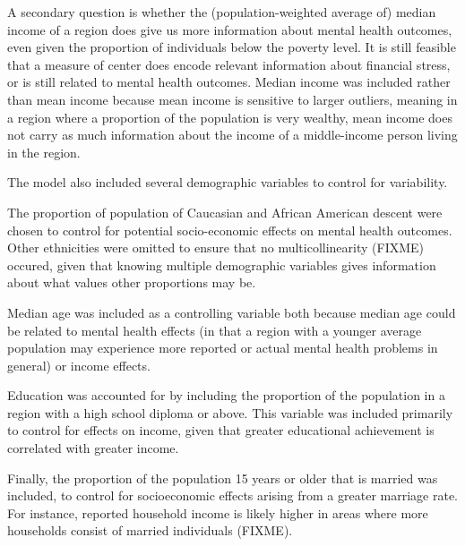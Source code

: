 \documentclass{article}
\begin{document}
A secondary question is whether the (population-weighted average of)
median income of a region does give us more information about mental
health outcomes, even given the proportion of individuals below the
poverty level. It is still feasible that a measure of center does encode
relevant information about financial stress, or is still related to
mental health outcomes. Median income was included rather than mean
income because mean income is sensitive to larger outliers, meaning in a
region where a proportion of the population is very wealthy, mean income
does not carry as much information about the income of a middle-income person
living in the region.

The model also included several demographic variables to control for
variability.

The proportion of population of Caucasian and African
American descent were chosen to control for potential socio-economic
effects on mental health outcomes. Other ethnicities were omitted to
ensure that no multicollinearity (FIXME) occured, given that knowing
multiple demographic variables gives information about what values other
proportions may be.

Median age was included as a controlling variable
both because median age could be related to mental health effects (in
that a region with a younger average population may experience more
reported or actual mental health problems in general) or income effects.

Education was accounted for by including the proportion of the
population in a region with a high school diploma or above. This
variable was included primarily to control for effects on income, given
that greater educational achievement is correlated with greater income.

Finally, the proportion of the population 15 years or older that is
married was included, to control for socioeconomic effects arising from
a greater marriage rate. For instance, reported household income is
likely higher in areas where more households consist of married
individuals (FIXME).

%
%
\end{document}
